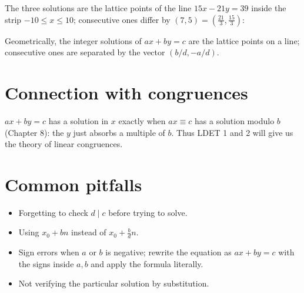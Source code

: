 The three solutions are the lattice points of the line $15x - 21y = 39$ inside the strip
$-10 \le x \le 10$; consecutive ones differ by $(7, 5) = (\frac{21}{3}, \frac{15}{3})$:
\begin{center}
\end{center}

\begin{aside}
Geometrically, the integer solutions of $ax + by = c$ are the lattice points on a line;
consecutive ones are separated by the vector $(b/d, -a/d)$.
\end{aside}

\section{Connection with congruences}

$ax + by = c$ has a solution in $x$ exactly when $ax \equiv c$ has a solution modulo $b$
(Chapter 8): the $y$ just absorbs a multiple of $b$. Thus LDET 1 and 2 will give us the theory of
linear congruences.

\section{Common pitfalls}
\begin{itemize}
  \item Forgetting to check $d \mid c$ before trying to solve.
  \item Using $x_0 + bn$ instead of $x_0 + \frac bd n$.
  \item Sign errors when $a$ or $b$ is negative; rewrite the equation as $ax + by = c$ with the
        signs inside $a,b$ and apply the formula literally.
  \item Not verifying the particular solution by substitution.
\end{itemize}

